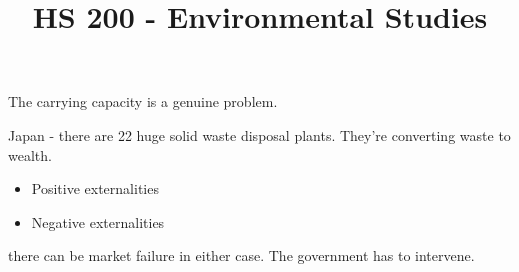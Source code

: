 \documentclass[a4paper]{article}
\title{HS 200 - Environmental Studies}
\date{}
\begin{document}

The carrying capacity is a genuine problem.

Japan - there  are 22 huge solid waste disposal plants. They're
converting waste to wealth. 

\begin{itemize}
	\item Positive externalities
	\item Negative externalities
\end{itemize}
there can be market failure in either case. The government  has to
intervene.
\end{document}
